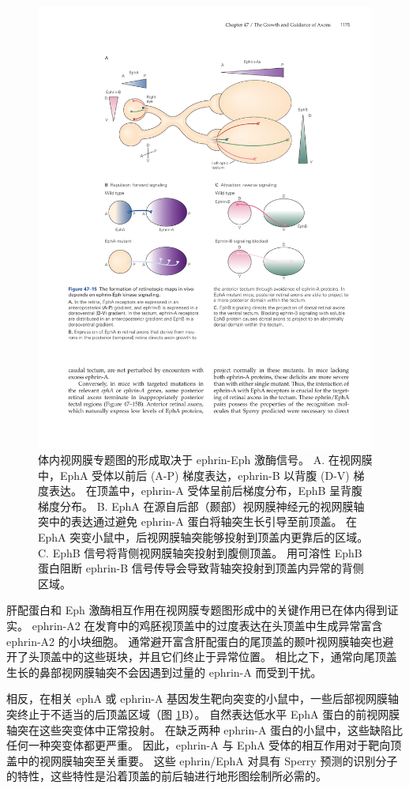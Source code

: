 \begin{figure}[htbp]
	\centering
	\includegraphics[width=0.8\linewidth]{chap47/fig_47_15}
	\caption{体内视网膜专题图的形成取决于 ephrin-Eph 激酶信号。 A. 在视网膜中，EphA 受体以前后 (A-P) 梯度表达，ephrin-B 以背腹 (D-V) 梯度表达。 在顶盖中，ephrin-A 受体呈前后梯度分布，EphB 呈背腹梯度分布。 B. EphA 在源自后部（颞部）视网膜神经元的视网膜轴突中的表达通过避免 ephrin-A 蛋白将轴突生长引导至前顶盖。 在 EphA 突变小鼠中，后视网膜轴突能够投射到顶盖内更靠后的区域。 C. EphB 信号将背侧视网膜轴突投射到腹侧顶盖。 用可溶性 EphB 蛋白阻断 ephrin-B 信号传导会导致背轴突投射到顶盖内异常的背侧区域。}
	\label{fig:47_15}
\end{figure}

肝配蛋白和 Eph 激酶相互作用在视网膜专题图形成中的关键作用已在体内得到证实。 ephrin-A2 在发育中的鸡胚视顶盖中的过度表达在头顶盖中生成异常富含 ephrin-A2 的小块细胞。 通常避开富含肝配蛋白的尾顶盖的颞叶视网膜轴突也避开了头顶盖中的这些斑块，并且它们终止于异常位置。 相比之下，通常向尾顶盖生长的鼻部视网膜轴突不会因遇到过量的 ephrin-A 而受到干扰。

相反，在相关 ephA 或 ephrin-A 基因发生靶向突变的小鼠中，一些后部视网膜轴突终止于不适当的后顶盖区域（图 \ref{fig:47_15}B）。 自然表达低水平 EphA 蛋白的前视网膜轴突在这些突变体中正常投射。 在缺乏两种 ephrin-A 蛋白的小鼠中，这些缺陷比任何一种突变体都更严重。 因此，ephrin-A 与 EphA 受体的相互作用对于靶向顶盖中的视网膜轴突至关重要。 这些 ephrin/EphA 对具有 Sperry 预测的识别分子的特性，这些特性是沿着顶盖的前后轴进行地形图绘制所必需的。

